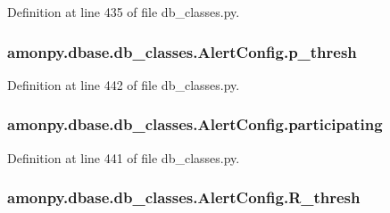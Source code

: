 Definition at line 435 of file db\-\_\-classes.\-py.

\hypertarget{classamonpy_1_1dbase_1_1db__classes_1_1_alert_config_a16d50003ae8ad8876cc0a7cb283c6968}{
\subsubsection[{p\-\_\-thresh}]{\setlength{\rightskip}{0pt plus 5cm}amonpy.\-dbase.\-db\-\_\-classes.\-Alert\-Config.\-p\-\_\-thresh}}\label{classamonpy_1_1dbase_1_1db__classes_1_1_alert_config_a16d50003ae8ad8876cc0a7cb283c6968}


Definition at line 442 of file db\-\_\-classes.\-py.

\hypertarget{classamonpy_1_1dbase_1_1db__classes_1_1_alert_config_a39184be5dae1af25cad32181fbe17c61}{
\subsubsection[{participating}]{\setlength{\rightskip}{0pt plus 5cm}amonpy.\-dbase.\-db\-\_\-classes.\-Alert\-Config.\-participating}}\label{classamonpy_1_1dbase_1_1db__classes_1_1_alert_config_a39184be5dae1af25cad32181fbe17c61}


Definition at line 441 of file db\-\_\-classes.\-py.

\hypertarget{classamonpy_1_1dbase_1_1db__classes_1_1_alert_config_aaede4885574230fc56b90fc989230a85}{
\subsubsection[{R\-\_\-thresh}]{\setlength{\rightskip}{0pt plus 5cm}amonpy.\-dbase.\-db\-\_\-classes.\-Alert\-Config.\-R\-\_\-thresh}}\label{classamonpy_1_1dbase_1_1db__classes_1_1_alert_config_aaede4885574230fc56b90fc989230a85}


